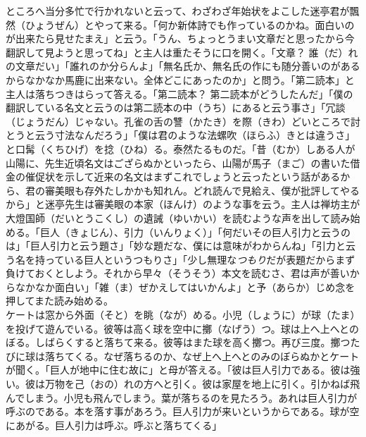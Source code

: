 \documentclass{book}
\begin{document}
ところへ当分多忙で行かれないと云って、わざわざ年始状をよこした迷亭君が飄然（ひょうぜん）とやって来る。「何か新体詩でも作っているのかね。面白いのが出来たら見せたまえ」と云う。「うん、ちょっとうまい文章だと思ったから今翻訳して見ようと思ってね」と主人は重たそうに口を開く。「文章？ 誰（だ）れの文章だい」「誰れのか分らんよ」「無名氏か、無名氏の作にも随分善いのがあるからなかなか馬鹿に出来ない。全体どこにあったのか」と問う。「第二読本」と主人は落ちつきはらって答える。「第二読本？ 第二読本がどうしたんだ」「僕の翻訳している名文と云うのは第二読本の中（うち）にあると云う事さ」「冗談（じょうだん）じゃない。孔雀の舌の讐（かたき）を際（きわ）どいところで討とうと云う寸法なんだろう」「僕は君のような法螺吹（ほらふ）きとは違うさ」と口髯（くちひげ）を捻（ひね）る。泰然たるものだ。「昔（むか）しある人が山陽に、先生近頃名文はござらぬかといったら、山陽が馬子（まご）の書いた借金の催促状を示して近来の名文はまずこれでしょうと云ったという話があるから、君の審美眼も存外たしかかも知れん。どれ読んで見給え、僕が批評してやるから」と迷亭先生は審美眼の本家（ほんけ）のような事を云う。主人は禅坊主が大燈国師（だいとうこくし）の遺誡（ゆいかい）を読むような声を出して読み始める。「巨人（きょじん）、引力（いんりょく）」「何だいその巨人引力と云うのは」「巨人引力と云う題さ」「妙な題だな、僕には意味がわからんね」「引力と云う名を持っている巨人というつもりさ」「少し無理な\emph{つもり}だが表題だからまず負けておくとしよう。それから早々（そうそう）本文を読むさ、君は声が善いからなかなか面白い」「雑（ま）ぜかえしてはいかんよ」と予（あらか）じめ念を押してまた読み始める。\\

ケートは窓から外面（そと）を眺（なが）める。小児（しょうに）が球（たま）を投げて遊んでいる。彼等は高く球を空中に擲（なげう）つ。球は上へ上へとのぼる。しばらくすると落ちて来る。彼等はまた球を高く擲つ。再び三度。擲つたびに球は落ちてくる。なぜ落ちるのか、なぜ上へ上へとのみのぼらぬかとケートが聞く。「巨人が地中に住む故に」と母が答える。「彼は巨人引力である。彼は強い。彼は万物を己（おの）れの方へと引く。彼は家屋を地上に引く。引かねば飛んでしまう。小児も飛んでしまう。葉が落ちるのを見たろう。あれは巨人引力が呼ぶのである。本を落す事があろう。巨人引力が来いというからである。球が空にあがる。巨人引力は呼ぶ。呼ぶと落ちてくる」\\
\end{document}
